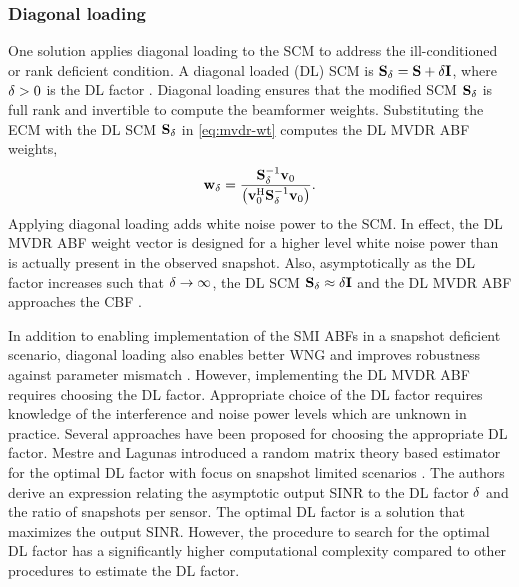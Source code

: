 \subsubsection{Diagonal loading}
\label{sec:diagonal-loading}
One solution applies diagonal loading to the SCM to address the
ill-conditioned or rank deficient condition. A diagonal loaded (DL)
SCM is ${\bf S}_\delta = {\bf S} + \delta{\bf I}{}$, where $\delta > 0$ is the
DL factor \cite{Carlson1988scm}. Diagonal loading ensures that the
modified SCM ${\bf S}_{\delta}$ is full rank and invertible to compute
the beamformer weights. Substituting the ECM with the DL SCM
${\bf S}_{\delta}$ in \eqref{eq:mvdr-wt} computes the DL MVDR ABF
weights,
\begin{equation*} 
    \label{eq:dlmvdr}
{\bf {\bf w}}_{\delta} = \frac{{\bf S}_{\delta}^{-1} {\bf v}_0}{\left({\bf v}_0^{\rm H}
{\bf S}_{\delta}^{-1} {\bf v}_0 \right)}.
\end{equation*}
Applying diagonal loading adds white noise power to the SCM. In
effect, the DL MVDR ABF weight vector is designed for a higher level
white noise power than is actually present in the observed
snapshot. Also, asymptotically as the DL factor increases such
that $\delta \rightarrow \infty$, the DL SCM
${\bf S}_\delta \approx \delta{\bf I}$ and the DL MVDR ABF approaches the CBF
\cite{vtree2002oap}.

In addition to enabling implementation of the SMI ABFs in a snapshot
deficient scenario, diagonal loading also enables better WNG and
improves robustness against parameter mismatch \cite{vtree2002oap,
  mestre2005diagonal}. However, implementing the DL MVDR ABF requires
choosing the DL factor. Appropriate choice of the DL factor requires
knowledge of the interference and noise power levels which are unknown
in practice. Several approaches have been proposed for choosing the
appropriate DL factor. Mestre and Lagunas introduced a random matrix
theory based estimator for the optimal DL factor with focus on
snapshot limited scenarios \cite{mestre2005diagonal}. The authors
derive an expression relating the asymptotic output SINR to the DL
factor $\delta$ and the ratio of snapshots per sensor. The optimal DL
factor is a solution that maximizes the output SINR. However, the
procedure to search for the optimal DL factor has a significantly
higher computational complexity compared to other procedures to
estimate the DL factor.


